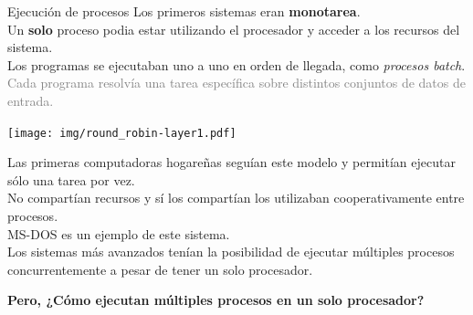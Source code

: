 \documentclass[aspectratio=169]{beamer}
\begin{document}
\begin{frame}{Ejecución de procesos}
    \small
    Los primeros sistemas eran \textbf{monotarea}.\\
    \textcolor{verdeuca}{Un \textbf{solo} proceso podia estar utilizando el procesador y acceder a los recursos del sistema.}\\
    \bigskip
    \pause
    Los programas se ejecutaban uno a uno en orden de llegada, como \emph{procesos batch}.\\ %
    \textcolor{gray}{Cada programa resolvía una tarea específica sobre distintos conjuntos de datos de entrada.}\\
    \begin{center}
        \texttt{[image: img/round\_robin-layer1.pdf]}
    \end{center}
    \pause
    Las primeras computadoras hogareñas seguían este modelo y permitían ejecutar sólo una tarea por vez.\\
    No compartían recursos y sí los compartían los utilizaban cooperativamente entre procesos.\\
    \textcolor{naranjauca}{MS-DOS es un ejemplo de este sistema.}\\
    \bigskip
    Los sistemas más avanzados tenían la posibilidad de ejecutar múltiples procesos concurrentemente a pesar de tener un solo procesador.
    \pause
    \begin{center}
    \textcolor{naranjauca}{\textbf{Pero, ¿Cómo ejecutan múltiples procesos en un solo procesador?}}
    \end{center}
\end{frame}
\end{document}
